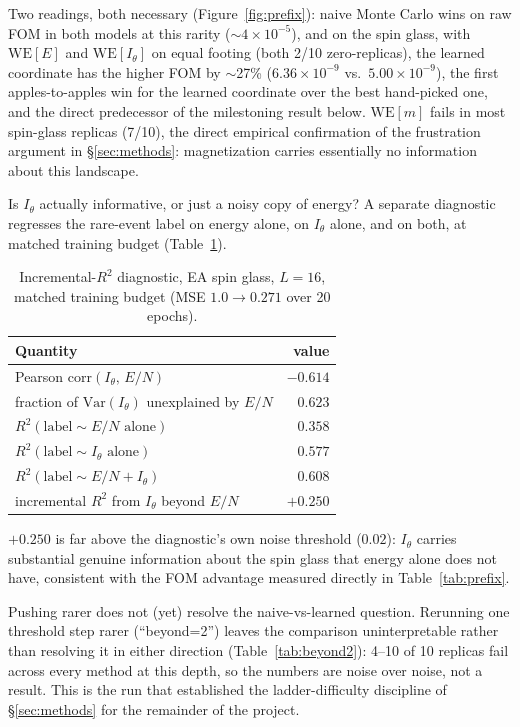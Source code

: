 \documentclass[11pt]{article}
\begin{document}
	Two readings, both necessary (Figure~\ref{fig:prefix}): naive Monte Carlo wins on raw FOM in both models at this
	rarity ($\sim\!4\times10^{-5}$), and on the spin glass, with $\mathrm{WE}[E]$ and
	$\mathrm{WE}[I_\theta]$ on equal footing (both 2/10 zero-replicas), the learned
		coordinate has the higher FOM by $\sim$27\% ($6.36\times10^{-9}$ vs.\ $5.00\times10^{-9}$),
	the first apples-to-apples win for the learned coordinate over the best hand-picked
	one, and the direct predecessor of the milestoning result below. $\mathrm{WE}[m]$ fails in
	most spin-glass replicas (7/10), the direct empirical confirmation of the frustration
	argument in \S\ref{sec:methods}: magnetization carries essentially no information about
	this landscape.
	
	Is $I_\theta$ actually informative, or just a noisy copy of energy? A separate
	diagnostic regresses the rare-event label on energy alone, on $I_\theta$ alone, and on
	both, at matched training budget (Table~\ref{tab:diagnostic}).
	
	\begin{table}[h]
		\centering\small
		\caption{Incremental-$R^2$ diagnostic, EA spin glass, $L=16$, matched training budget
			(MSE $1.0\to0.271$ over 20 epochs).}
		\label{tab:diagnostic}
		\begin{tabular}{lr}
			\toprule
			Quantity & value \\
			\midrule
			Pearson corr$(I_\theta,\,E/N)$ & $-0.614$ \\
			fraction of $\mathrm{Var}(I_\theta)$ unexplained by $E/N$ & $0.623$ \\
			$R^2(\text{label}\sim E/N\text{ alone})$ & $0.358$ \\
			$R^2(\text{label}\sim I_\theta\text{ alone})$ & $0.577$ \\
			$R^2(\text{label}\sim E/N+I_\theta)$ & $0.608$ \\
			incremental $R^2$ from $I_\theta$ beyond $E/N$ & $+0.250$ \\
			\bottomrule
		\end{tabular}
	\end{table}
	
	$+0.250$ is far above the diagnostic's own noise threshold ($0.02$): $I_\theta$ carries
	substantial genuine information about the spin glass that energy alone does not have,
	consistent with the FOM advantage measured directly in Table~\ref{tab:prefix}.
	
	Pushing rarer does not (yet) resolve the naive-vs-learned question. Rerunning one
	threshold step rarer (``beyond=2'') leaves the comparison uninterpretable rather than
	resolving it in either direction (Table~\ref{tab:beyond2}): 4--10 of 10 replicas fail
	across every method at this depth, so the numbers are noise over noise, not a result. This
	is the run that established the ladder-difficulty discipline of \S\ref{sec:methods} for the
	remainder of the project.
	
\end{document}
